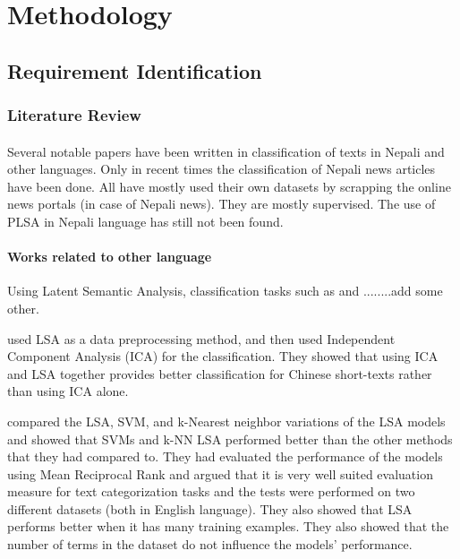 \documentclass[12pt]{article}
\begin{document}
    \section{Methodology}
        \subsection{Requirement Identification}
            \subsubsection{Literature Review}
                \paragraph{}
                    Several notable papers have been written in classification of texts in Nepali and other languages. Only in recent times the classification of Nepali news articles have been done.
                    All have mostly used their own datasets by scrapping the online news portals (in case of Nepali news). They are mostly supervised. The use of PLSA in Nepali language has still not been found.
                    
                    \paragraph{Works related to other language}
                            Using Latent Semantic Analysis, classification tasks such as \cite{pu2006short} and \cite{cardoso2003empirical}........add some other.

                            \cite{pu2006short} used LSA as a data preprocessing method, and then used Independent Component Analysis (ICA) for the classification. They showed that 
                            using ICA and LSA together provides better classification for Chinese short-texts rather than using ICA alone. 
                            
                            \cite{cardoso2003empirical} compared the LSA, SVM, and k-Nearest neighbor variations of the LSA models and showed that SVMs and k-NN LSA performed better 
                            than the other methods that they had compared to. They had evaluated the performance of the models using Mean Reciprocal Rank and argued that it is very well
                            suited evaluation measure for text categorization tasks and the tests were performed on two different datasets (both in English language). They also showed that LSA performs better 
                            when it has many training examples. They also showed that the number of terms in the dataset do not influence the models' performance. 
\end{document}
